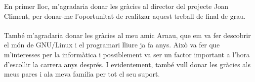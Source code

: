 En primer lloc, m'agradaria donar les gràcies al director del projecte Joan Climent, per donar-me l'oportunitat de realitzar aquest treball de final de grau.\\\\
També m'agradaria donar les gràcies al meu amic Arnau, que em va fer descobrir el món de GNU/Linux i el programari lliure ja fa anys. Això va fer que m'interesses per la informàtica i possiblement va ser un
factor important a l'hora d'escollir la carrera anys després. I evidentement, també vull donar les gràcies als meus pares i ala meva familia per tot el seu suport.
